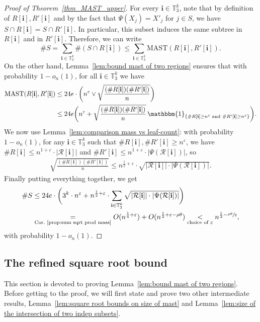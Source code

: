 \documentclass[JEP,XML,SOM,Unicode,NoFloatCountersInSection,published]{cedram}
\newcommand{\indicator}[1]{\mathbbm{1}_{#1}}
\newcommand{\MAST}{\mathrm{MAST}}
\newcommand{\Rr}{\mathcal{R}}
\newcommand{\ii}{\mathbf{i}}
\let\eps\varepsilon
\theoremstyle{plain}
\theoremstyle{definition}
\begin{document}
\begin{proof}[Proof of Theorem~\ref{thm_MAST_upper}]
For every $\ii \in \mathbb{T}_3^k$, note that by definition of $R[\ii], R'[\ii]$ and by the fact that \hbox{$\Psi(X_j)=X'_j$} for $j \in S$, we have $S \cap R[\ii]=S \cap R'[\ii]$. In particular, this subset induces the same subtree in $R[\ii]$ and in $R'[\ii]$. Therefore, we can write\vspace*{-3pt}
\[ \# S = \sum_{\ii \in \mathbb{T}_3^k} \#(S \cap R[\ii]) \leq \sum_{\ii \in \mathbb{T}_3^k} \MAST \left( R[\ii], R'[\ii] \right). \]
On the other hand, Lemma~\ref{lem:bound mast of two regions} ensures that with probability $1-o_n(1)$, for all $\ii \in \mathbb{T}_3^k$ we have\vspace*{-3pt}
\begin{align*}
\mathrm{MAST}(R[\ii] ,R'[\ii])
&\leq 24e \cdot \biggl(n^\eps \vee \sqrt{\frac{(\#R[\ii] )(\#R'[\ii] )}{n}}\biggr)\\
&\leq 24e \biggl(n^\eps + \sqrt{\frac{(\#R[\ii] )(\#R'[\ii] )}{n}}\,\indicator{\{\#R[\ii] \geq n^\eps \text{ and } \#R'[\ii] \geq n^\eps\}} \biggr).
\end{align*}
We now use Lemma~\ref{lem:comparison mass vs leaf-count}: with probability $1-o_n(1)$, for any $\ii \in \mathbb{T}_3^k$ such that $\#R[\ii], \#R'[\ii] \geq n^{\eps}$, we have $\#R[\ii]\leq n^{1+\eps}\cdot|\Rr[\ii]|$ and $\#R'[\ii] \leq n^{1+\eps}\cdot|\Psi(\Rr[\ii])|$, so
\begin{align*}
\sqrt{\frac{(\#R[\ii] )(\#R'[\ii])}{n}} \leq n^{\frac{1}{2}+\eps} \cdot \sqrt{|\Rr[\ii] | \cdot |\Psi(\Rr[\ii] )|}.
\end{align*}
Finally putting everything together, we get\vspace*{-3pt}
\begin{align*}
\#S & \leq 24 e \cdot \biggl( 3^k\cdot n^\eps + n^{\frac{1}{2}+\eps}\cdot \sum_{\ii \in \mathbb{T}_3^k} \sqrt{|\Rr[\ii] | \cdot |\Psi(\Rr[\ii])|}\biggr)\\
&\underset{\text{Cor.~\ref{prop:sum sqrt prod mass}}}{=} O(n^{\frac{1}{4}+\eps}) + O(n^{\frac{1}{2}+\eps -\rho \theta})\underset{\text{choice of $\eps$}}{<} n^{\frac{1}{2}-\sfrac{\rho \theta}{2}},
\end{align*}
with probability $1-o_n(1)$.
\end{proof}
\subsection{The refined square root bound}
This section is devoted to proving Lem\-ma~\ref{lem:bound mast of two regions}.
Before getting to the proof, we will first state and prove two other intermediate results, Lemma~\ref{lem:square root bounds on size of mast} and Lemma~\ref{lem:size of the intersection of two indep subsets}.
\end{document}
